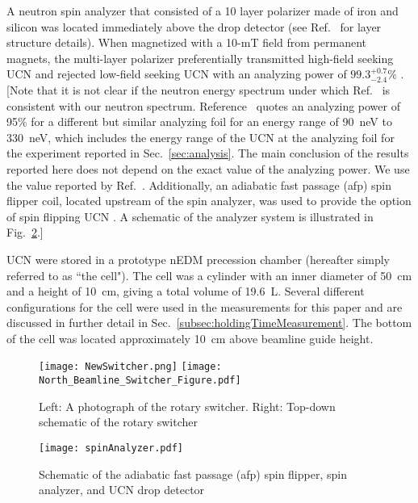 A neutron spin analyzer that consisted of a 10 layer polarizer made of iron and silicon was located immediately above the drop detector (see Ref.~\cite{ThorstenThesis} for layer structure details). When magnetized with a 10-mT field from permanent magnets, the multi-layer polarizer preferentially transmitted high-field seeking UCN and rejected low-field seeking UCN with an analyzing power of $99.3^{+0.7}_{-2.4}\%$ \cite{ThorstenThesis}. [Note that it is not clear if the neutron energy spectrum under which Ref.~\cite{ThorstenThesis} is consistent with our neutron spectrum. Reference~\cite{afach_device_2015} quotes an analyzing power of 95\% for a different but similar analyzing foil for an energy range of 90~neV to 330~neV, which includes the energy range of the UCN at the analyzing foil for the experiment reported in Sec.~\ref{sec:analysis}. The main conclusion of the results reported here does not depend on the exact value of the analyzing power. We use the value reported by Ref.~\cite{ThorstenThesis}.   Additionally, an adiabatic fast passage (\acrshort{afp}) spin flipper coil, located upstream of the spin analyzer, was used to provide the option of spin flipping UCN \cite{holley_afp_2012}. A schematic of the analyzer system is illustrated in Fig.~\ref{fig:SpinAnalyzer}.]

UCN were stored in a prototype nEDM precession chamber (hereafter simply referred to as ``the cell"). The cell was a cylinder with an inner diameter of \qty{50}{\cm} and a height of \qty{10}{\cm}, giving a total volume of \qty{19.6}{\liter}. Several different configurations for the cell were used in the measurements for this paper and are discussed in further detail in Sec.~\ref{subsec:holdingTimeMeasurement}. The bottom of the cell was located approximately \qty{10}{\cm} above beamline guide height.

\begin{figure}[htp]
    \centering
    \texttt{[image: NewSwitcher.png]}
    \hspace{1em}
    \texttt{[image: North\_Beamline\_Switcher\_Figure.pdf]}
    \caption[Photograph and schematic of rotary switcher]{Left: A photograph of the rotary switcher. Right: Top-down schematic of the rotary switcher}\label{fig:NewSwitcher}
\end{figure}


\begin{figure}[htp]
    \centering
    \texttt{[image: spinAnalyzer.pdf]}
    \caption{Schematic of the adiabatic fast passage (\acrshort{afp}) spin flipper, spin analyzer, and UCN drop detector}
    \label{fig:SpinAnalyzer}
\end{figure}

